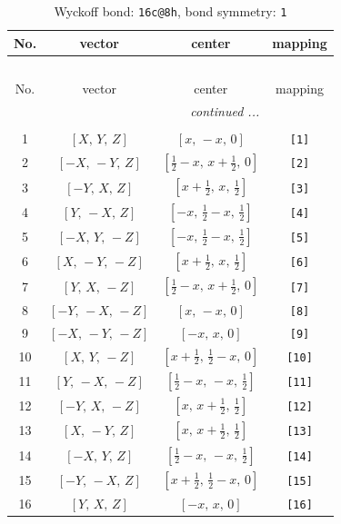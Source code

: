 \documentclass[fleqn,8pt]{jsarticle}
\begin{document}
\begin{longtable}{cccc}
\caption{Wyckoff bond: {\tt 16c@8h}, bond symmetry: {\tt 1}}
 \\
 \hline \hline
No. & vector & center & mapping \\ \hline \endfirsthead

\multicolumn{3}{l}{\tablename\ \thetable{}} \\
 \hline \hline
No. & vector & center & mapping \\ \hline \endhead

 \hline \hline
\multicolumn{3}{r}{\footnotesize\it continued ...} \\ \endfoot

 \hline \hline
\multicolumn{3}{r}{} \\ \endlastfoot

1 & $\left[ X,\, Y,\, Z \right]$ & $\left[ x,\, - x,\, 0 \right]$ & {\tt [1]} \\ \hline
2 & $\left[ - X,\, - Y,\, Z \right]$ & $\left[ \frac{1}{2} - x,\, x + \frac{1}{2},\, 0 \right]$ & {\tt [2]} \\ \hline
3 & $\left[ - Y,\, X,\, Z \right]$ & $\left[ x + \frac{1}{2},\, x,\, \frac{1}{2} \right]$ & {\tt [3]} \\ \hline
4 & $\left[ Y,\, - X,\, Z \right]$ & $\left[ - x,\, \frac{1}{2} - x,\, \frac{1}{2} \right]$ & {\tt [4]} \\ \hline
5 & $\left[ - X,\, Y,\, - Z \right]$ & $\left[ - x,\, \frac{1}{2} - x,\, \frac{1}{2} \right]$ & {\tt [5]} \\ \hline
6 & $\left[ X,\, - Y,\, - Z \right]$ & $\left[ x + \frac{1}{2},\, x,\, \frac{1}{2} \right]$ & {\tt [6]} \\ \hline
7 & $\left[ Y,\, X,\, - Z \right]$ & $\left[ \frac{1}{2} - x,\, x + \frac{1}{2},\, 0 \right]$ & {\tt [7]} \\ \hline
8 & $\left[ - Y,\, - X,\, - Z \right]$ & $\left[ x,\, - x,\, 0 \right]$ & {\tt [8]} \\ \hline
9 & $\left[ - X,\, - Y,\, - Z \right]$ & $\left[ - x,\, x,\, 0 \right]$ & {\tt [9]} \\ \hline
10 & $\left[ X,\, Y,\, - Z \right]$ & $\left[ x + \frac{1}{2},\, \frac{1}{2} - x,\, 0 \right]$ & {\tt [10]} \\ \hline
11 & $\left[ Y,\, - X,\, - Z \right]$ & $\left[ \frac{1}{2} - x,\, - x,\, \frac{1}{2} \right]$ & {\tt [11]} \\ \hline
12 & $\left[ - Y,\, X,\, - Z \right]$ & $\left[ x,\, x + \frac{1}{2},\, \frac{1}{2} \right]$ & {\tt [12]} \\ \hline
13 & $\left[ X,\, - Y,\, Z \right]$ & $\left[ x,\, x + \frac{1}{2},\, \frac{1}{2} \right]$ & {\tt [13]} \\ \hline
14 & $\left[ - X,\, Y,\, Z \right]$ & $\left[ \frac{1}{2} - x,\, - x,\, \frac{1}{2} \right]$ & {\tt [14]} \\ \hline
15 & $\left[ - Y,\, - X,\, Z \right]$ & $\left[ x + \frac{1}{2},\, \frac{1}{2} - x,\, 0 \right]$ & {\tt [15]} \\ \hline
16 & $\left[ Y,\, X,\, Z \right]$ & $\left[ - x,\, x,\, 0 \right]$ & {\tt [16]} \\
\end{longtable}
\end{document}
